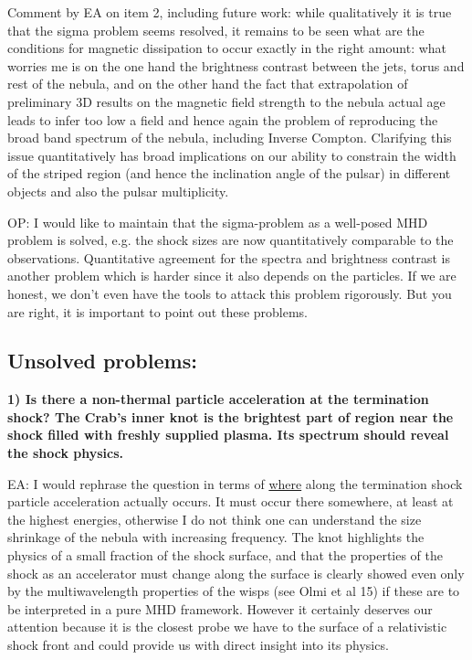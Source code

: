 Comment by EA on item 2, including future work: while qualitatively it is true that the sigma problem seems resolved, it remains to be seen what are the conditions for magnetic dissipation to occur exactly in the right amount: what worries me is on the one hand the brightness contrast between the jets, torus and rest of the nebula, and on the other hand the fact that extrapolation of preliminary 3D results on the magnetic field strength to the nebula actual age leads to infer too low a field and hence again the problem of reproducing the broad band spectrum of the nebula, including Inverse Compton.
Clarifying this issue quantitatively has broad implications on our ability to constrain the width of the striped region (and hence the inclination angle of the pulsar) in different objects and also the pulsar multiplicity. 

OP: I would like to maintain that the sigma-problem as a well-posed MHD problem is solved, e.g. the shock sizes are now quantitatively comparable to the observations.  Quantitative agreement for the spectra and brightness contrast is another problem which is harder since it also depends on the particles.  If we are honest, we don't even have the tools to attack this problem rigorously.  But you are right, it is important to point out these problems.  


\subsection{Unsolved problems:}

\textbf{1) Is there a non-thermal particle acceleration at the termination shock? The Crab's inner knot is the brightest part of region near the shock filled with freshly supplied plasma. Its spectrum should reveal the shock physics. }

EA: I would rephrase the question in terms of \underline{where} along the termination shock particle acceleration actually occurs. It must occur there somewhere, at least at the highest energies, otherwise I do not think one can understand the size shrinkage of the nebula with increasing frequency. 
The knot highlights the physics of a small fraction of the shock surface, and that the properties of the shock as an accelerator must change along the surface is clearly showed even only by the multiwavelength properties of the wisps (see Olmi et al 15) if these are to be interpreted in a pure MHD framework. However it certainly deserves our attention because it is the closest probe we have to the surface of a relativistic shock front and could provide us with direct insight into its physics. 


